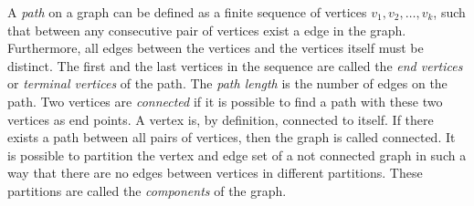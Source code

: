 A \emph{path} on a graph can be defined as a finite sequence of vertices \(v_1,v_2,\dots,v_k\), such that between any consecutive pair of vertices exist a edge in the graph.  
Furthermore, all edges between the vertices and the vertices itself must be distinct. 
The first and the last vertices in the sequence are called the \emph{end vertices} or \emph{terminal vertices} of the path.
The \emph{path length} is the number of edges on the path.
Two vertices are \emph{connected} if it is possible to find a path with these two vertices as end points.
A vertex is, by definition, connected to itself.
If there exists a path between all pairs of vertices, then the graph is called connected.
It is possible to partition the vertex and edge set of a not connected graph in such a way that there are no edges between vertices in different partitions.
These partitions are called the \emph{components} of the graph.